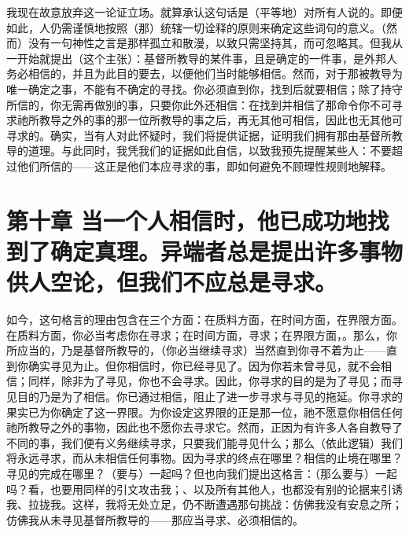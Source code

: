 我现在故意放弃这一论证立场。就算承认这句话是（平等地）对所有人说的。即便如此，人仍需谨慎地按照（那）统辖一切诠释的原则来确定这些词句的意义。（然而）没有一句神性之言是那样孤立和散漫，以致只需坚持其，而可忽略其。但我从一开始就提出（这个主张）：基督所教导的某件事，且是确定的一件事，是外邦人务必相信的，并且为此目的要去，以便他们当时能够相信。然而，对于那被教导为唯一确定之事，不能有不确定的寻找。你必须直到你，找到后就要相信；除了持守所信的，你无需再做别的事，只要你此外还相信：在找到并相信了那命令你不可寻求祂所教导之外的事的那一位所教导的事之后，再无其他可相信，因此也无其他可寻求的。确实，当有人对此怀疑时，我们将提供证据，证明我们拥有那由基督所教导的道理。与此同时，我凭我们的证据如此自信，以致我预先提醒某些人：不要超过他们所信的——这正是他们本应寻求的事，即如何避免不顾理性规则地解释。\par


\section{第十章 当一个人相信时，他已成功地找到了确定真理。异端者总是提出许多事物供人空论，但我们不应总是寻求。}

如今，这句格言的理由包含在三个方面：在质料方面，在时间方面，在界限方面。在质料方面，你必当考虑你在寻求；在时间方面，寻求；在界限方面，。那么，你所应当的，乃是基督所教导的，（你必当继续寻求）当然直到你寻不着为止——直到你确实寻见为止。但你相信时，你已经寻见了。因为你若未曾寻见，就不会相信；同样，除非为了寻见，你也不会寻求。因此，你寻求的目的是为了寻见；而寻见目的乃是为了相信。你已通过相信，阻止了进一步寻求与寻见的拖延。你寻求的果实已为你确定了这一界限。为你设定这界限的正是那一位，祂不愿意你相信任何祂所教导之外的事物，因此也不愿你去寻求它。然而，正因为有许多人各自教导了不同的事，我们便有义务继续寻求，只要我们能寻见什么；那么（依此逻辑）我们将永远寻求，而从未相信任何事物。因为寻求的终点在哪里？相信的止境在哪里？寻见的完成在哪里？（要与）一起吗？但也向我们提出这格言：（那么要与）一起吗？看，也要用同样的引文攻击我；、以及所有其他人，也都没有别的论据来引诱我、拉拢我。这样，我将无处立足，仍不断遭遇那句挑战：仿佛我没有安息之所；仿佛我从未寻见基督所教导的——那应当寻求、必须相信的。\par

